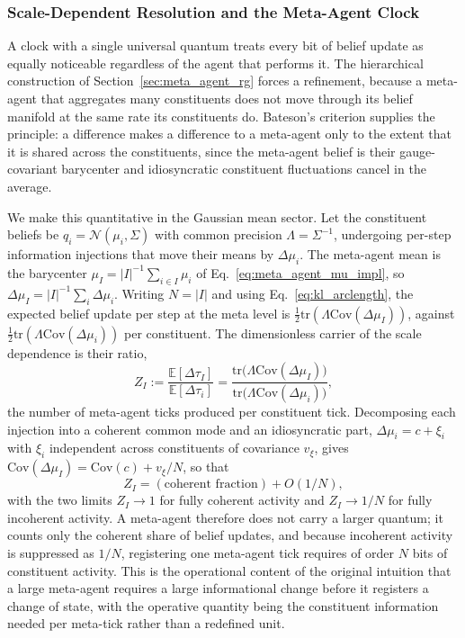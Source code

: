\documentclass[11pt]{article}
\begin{document}
\subsubsection{Scale-Dependent Resolution and the Meta-Agent Clock}
\label{sec:scale_dependent_time}

A clock with a single universal quantum treats every bit of belief update as equally noticeable regardless of the agent that performs it. The hierarchical construction of Section~\ref{sec:meta_agent_rg} forces a refinement, because a meta-agent that aggregates many constituents does not move through its belief manifold at the same rate its constituents do. Bateson's criterion supplies the principle: a difference makes a difference to a meta-agent only to the extent that it is shared across the constituents, since the meta-agent belief is their gauge-covariant barycenter and idiosyncratic constituent fluctuations cancel in the average.

We make this quantitative in the Gaussian mean sector. Let the constituent beliefs be $q_i = \mathcal{N}(\mu_i, \Sigma)$ with common precision $\Lambda = \Sigma^{-1}$, undergoing per-step information injections that move their means by $\Delta\mu_i$. The meta-agent mean is the barycenter $\mu_I = |I|^{-1}\sum_{i\in I}\mu_i$ of Eq.~\eqref{eq:meta_agent_mu_impl}, so $\Delta\mu_I = |I|^{-1}\sum_i \Delta\mu_i$. Writing $N = |I|$ and using Eq.~\eqref{eq:kl_arclength}, the expected belief update per step at the meta level is $\tfrac{1}{2}\mathrm{tr}(\Lambda\mathrm{Cov}(\Delta\mu_I))$, against $\tfrac{1}{2}\mathrm{tr}(\Lambda\mathrm{Cov}(\Delta\mu_i))$ per constituent. The dimensionless carrier of the scale dependence is their ratio,
\begin{equation}
Z_I := \frac{\mathbb{E}[\Delta\tau_I]}{\mathbb{E}[\Delta\tau_i]} = \frac{\mathrm{tr}\big(\Lambda\mathrm{Cov}(\Delta\mu_I)\big)}{\mathrm{tr}\big(\Lambda\mathrm{Cov}(\Delta\mu_i)\big)},
\label{eq:bit_production_ratio}
\end{equation}
the number of meta-agent ticks produced per constituent tick. Decomposing each injection into a coherent common mode and an idiosyncratic part, $\Delta\mu_i = c + \xi_i$ with $\xi_i$ independent across constituents of covariance $v_\xi$, gives $\mathrm{Cov}(\Delta\mu_I) = \mathrm{Cov}(c) + v_\xi/N$, so that
\begin{equation}
Z_I = (\text{coherent fraction}) + O(1/N),
\label{eq:Z_decomposition}
\end{equation}
with the two limits $Z_I \to 1$ for fully coherent activity and $Z_I \to 1/N$ for fully incoherent activity. A meta-agent therefore does not carry a larger quantum; it counts only the coherent share of belief updates, and because incoherent activity is suppressed as $1/N$, registering one meta-agent tick requires of order $N$ bits of constituent activity. This is the operational content of the original intuition that a large meta-agent requires a large informational change before it registers a change of state, with the operative quantity being the constituent information needed per meta-tick rather than a redefined unit.
\end{document}
